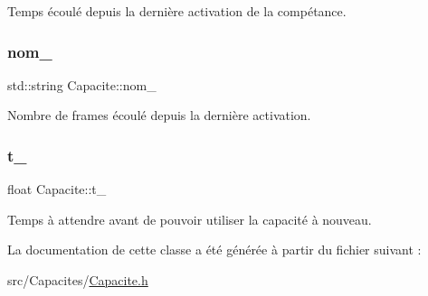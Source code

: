 Temps écoulé depuis la dernière activation de la compétance. 

\mbox{\label{class_capacite_a430472b509233086cbad1d6d8332dc8c}} 
\subsubsection{\texorpdfstring{nom\+\_\+}{nom\_}}
{\footnotesize\ttfamily std\+::string Capacite\+::nom\+\_\+\hspace{0.3cm}{\ttfamily [protected]}}



Nombre de frames écoulé depuis la dernière activation. 

\mbox{\label{class_capacite_ade805898750e70261be4f4ced92a9063}} 
\subsubsection{\texorpdfstring{t\+\_\+}{t\_}}
{\footnotesize\ttfamily float Capacite\+::t\+\_\+\hspace{0.3cm}{\ttfamily [protected]}}



Temps à attendre avant de pouvoir utiliser la capacité à nouveau. 



La documentation de cette classe a été générée à partir du fichier suivant \+:\begin{DoxyCompactItemize}
\item 
src/\+Capacites/\hyperlink{_capacite_8h}{Capacite.\+h}\end{DoxyCompactItemize}
